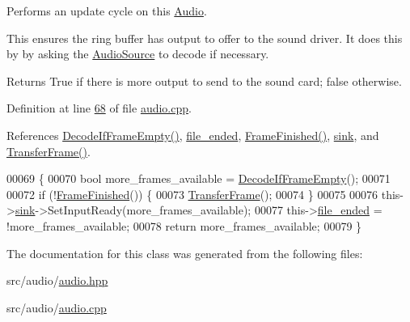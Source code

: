 Performs an update cycle on this \hyperlink{classAudio}{Audio}. 

This ensures the ring buffer has output to offer to the sound driver. It does this by by asking the \hyperlink{classAudioSource}{Audio\+Source} to decode if necessary. \begin{DoxyReturn}{Returns}
True if there is more output to send to the sound card; false otherwise. 
\end{DoxyReturn}


Definition at line \hyperlink{audio_8cpp_source_l00068}{68} of file \hyperlink{audio_8cpp_source}{audio.\+cpp}.



References \hyperlink{audio_8cpp_source_l00101}{Decode\+If\+Frame\+Empty()}, \hyperlink{audio_8hpp_source_l00144}{file\+\_\+ended}, \hyperlink{audio_8cpp_source_l00128}{Frame\+Finished()}, \hyperlink{audio_8hpp_source_l00141}{sink}, and \hyperlink{audio_8cpp_source_l00081}{Transfer\+Frame()}.


\begin{DoxyCode}
00069 \{
00070     \textcolor{keywordtype}{bool} more\_frames\_available = \hyperlink{classAudio_a3d7e118920b983906dc915428242df2e}{DecodeIfFrameEmpty}();
00071 
00072     \textcolor{keywordflow}{if} (!\hyperlink{classAudio_afab4e39f1e74e9a20ab456da2944a3aa}{FrameFinished}()) \{
00073         \hyperlink{classAudio_a9657995aa27bef00b6880f5a7bafd629}{TransferFrame}();
00074     \}
00075 
00076     this->\hyperlink{classAudio_ae7dddd283486a0d1555e9bc6a0d63cff}{sink}->SetInputReady(more\_frames\_available);
00077     this->\hyperlink{classAudio_acec4f6ef3a89f170bdaed5670efd092c}{file\_ended} = !more\_frames\_available;
00078     \textcolor{keywordflow}{return} more\_frames\_available;
00079 \}
\end{DoxyCode}


The documentation for this class was generated from the following files\+:\begin{DoxyCompactItemize}
\item 
src/audio/\hyperlink{audio_8hpp}{audio.\+hpp}\item 
src/audio/\hyperlink{audio_8cpp}{audio.\+cpp}\end{DoxyCompactItemize}
